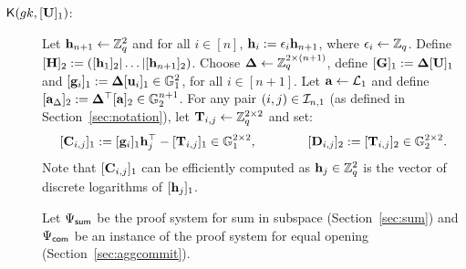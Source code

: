 \begin{description} \label{bits-proof-system}


\item[$\mathsf{K}({gk}, {[\mathbf{{U}}]_1})$:]
Let $\mathbf{h}_{n+1}\gets \mathbb{Z}_q^2$
and for all $i \in [n]$, $\mathbf{h}_{i}:=\epsilon_{i}\mathbf{h}_{n+1}$, where
$\epsilon_{i} \leftarrow \mathbb{Z}_q$. Define
$[{\mathbf{{H}}}]_2 := ([\mathbf{h}_1]_2| \ldots |[\mathbf{h}_{n+1}]_2)$.
Choose 
$\mathbf{{\Delta}} \leftarrow \mathbb{Z}_q^{2 \times (n+1)}$,
define $[\mathbf{{G}}]_1 := \mathbf{{\Delta}}[\mathbf{{U}}]_1$
and $[\mathbf{g}_{i}]_1:=\mathbf{{\Delta}} [\mathbf{u}_i]_1 \in \mathbb{G}_1^2$, for all $i \in [n+1]$. 
Let $\mathbf{a} \leftarrow \mathcal{L}_{1}$ and define $[\mathbf{a}_{\Delta}]_2:=\mathbf{{\Delta}}^\top[\mathbf{a}]_2 \in \mathbb{G}_2^{n+1}$. 
For any pair $(i,j) \in \mathcal{I}_{n,1}$ (as defined in Section~\ref{sec:notation}), let 
$\mathbf{{T}}_{i,j}\gets\mathbb{Z}_q^{2\times2}$ and set:
$$[\mathbf{{C}}_{i,j}]_1:=[\mathbf{g}_i]_1 \mathbf{h}_j^{\top} - [\mathbf{{T}}_{i,j}]_1  \in \mathbb{G}_1^{2 \times 2},
\qquad \qquad 
[\mathbf{{D}}_{i,j}]_2:=[\mathbf{{T}}_{i,j}]_2 \in \mathbb{G}_2^{2 \times 2}.$$ 
Note that $[\mathbf{{C}}_{i,j}]_1$ can be efficiently computed 
as $\mathbf{h}_j \in \mathbb{Z}_q^{2}$ is the vector of discrete logarithms of $[\mathbf{h}_j]_1$.

Let ${\Psi_{\mathsf{sum}}}$ be the proof system for sum in subspace 
(Section~\ref{sec:sum}) and ${\Psi_{\mathsf{com}}}$
be an instance of the proof system for equal opening (Section~\ref{sec:aggcommit}).


\end{description}
